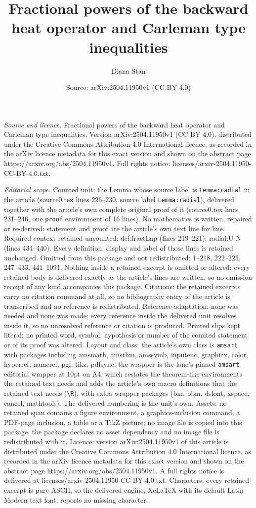 \documentclass[10pt,a4paper]{amsart}
\title[Fractional powers of the backward heat operator and Carleman]{Fractional powers of the backward heat operator and Carleman type inequalities}
\author{Diana Stan}
\date{Source: arXiv:2504.11950v1 (CC BY 4.0)}
\begin{document}
\maketitle

\noindent\emph{Source and licence.} Fractional powers of the backward heat operator and Carleman type inequalities. Version arXiv:2504.11950v1 (CC BY 4.0), distributed under the Creative Commons Attribution 4.0 International licence, as recorded in the arXiv licence metadata for this exact version and shown on the abstract page https://arxiv.org/abs/2504.11950v1. Full rights notice: licenses/arxiv-2504.11950-CC-BY-4.0.txt.\par\smallskip

\noindent\textit{Editorial scope.} Counted unit: the Lemma whose source label is \texttt{Lemma:radial} in the article (source0.tex lines 226--230, source label \texttt{Lemma:radial}), delivered together with the article's own complete original proof of it (source0.tex lines 231--246, one \texttt{proof} environment of 16 lines). No mathematics is written, repaired or re-derived: statement and proof are the article's own text line for line. Required context retained uncounted: def:fractLap (lines 219--221); radial:U-N (lines 434--440). Every definition, display and label of those lines is retained unchanged. Omitted from this package and not redistributed: 1--218, 222--225, 247--433, 441--1091. Nothing inside a retained excerpt is omitted or altered: every retained body is delivered exactly as the article's lines are written, so no omission receipt of any kind accompanies this package. Citations: the retained excerpts carry no citation command at all, so no bibliography entry of the article is transcribed and no reference is redistributed. Reference adaptation: none was needed and none was made; every reference inside the delivered unit resolves inside it, so no unresolved reference or citation is produced. Printed slips kept literal: no printed word, symbol, hypothesis or number of the counted statement or of its proof was altered. Layout and class: the article's own class is \texttt{amsart} with packages including amsmath, amsthm, amssymb, inputenc, graphicx, color, hyperref, nameref, pgf, tikz, pdfsync; the wrapper is the lane's pinned \texttt{amsart} editorial wrapper at 10pt on A4, which restates the theorem-like environments the retained text needs and adds the article's own macro definitions that the retained text needs (\texttt{\textbackslash R}), with extra wrapper packages (bm, bbm, dsfont, xspace, cancel, mathtools). The delivered numbering is the unit's own. Assets: no retained span contains a figure environment, a graphics-inclusion command, a PDF-page inclusion, a table or a TikZ picture; no image file is copied into this package, the package declares no asset dependency and no image file is redistributed with it. Licence: version arXiv:2504.11950v1 of this article is distributed under the Creative Commons Attribution 4.0 International licence, as recorded in the arXiv licence metadata for this exact version and shown on the abstract page https://arxiv.org/abs/2504.11950v1. A full rights notice is delivered at licenses/arxiv-2504.11950-CC-BY-4.0.txt. Characters: every retained excerpt is pure ASCII, so the delivered engine, XeLaTeX with its default Latin Modern text font, reports no missing character.
\end{document}
